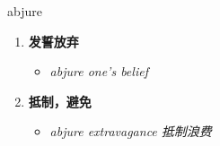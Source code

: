 
\begin{frame}
{\huge abjure}
\begin{center}
\begin{enumerate}\Large
  \item \textbf{发誓放弃}
  \begin{itemize}
    \item \em{\Large{abjure one's belief}}
  \end{itemize}
  \item \textbf{抵制，避免}
  \begin{itemize}
    \item \em{\Large{abjure extravagance 抵制浪费}}
  \end{itemize}
\end{enumerate}
\end{center}
\end{frame}
